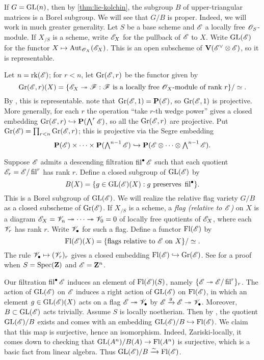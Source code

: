 \begin{example}
If $G=\operatorname{GL}(n)$, then by \autoref{thm:lie-kolchin}, the subgroup $B$ of 
upper-triangular matrices is a Borel subgroup. We will see that 
$G/B$ is proper. Indeed, we will work in much greater generality. Let $S$ be a 
base scheme and $\mathscr{E}$ a locally free $\mathscr{O}_S$-module. If $X_{/S}$ is a scheme, 
write $\mathscr{E}_X$ for the pullback of $\mathscr{E}$ to $X$. Write $\operatorname{GL}(\mathscr{E})$ for the 
functor $X\mapsto \operatorname{Aut}_{\mathscr{O}_X}(\mathscr{E}_X)$. This is an open subscheme of 
$\mathbf{V}(\mathscr{E}^\vee\otimes \mathscr{E})$, so it is representable. 

Let $n=\operatorname{rk}(\mathscr{E})$; for $r<n$, let $\operatorname{Gr}(\mathscr{E},r)$ be the functor given 
by 
\[
  \operatorname{Gr}(\mathscr{E},r)(X) = \{\mathscr{E}_X\twoheadrightarrow \mathscr{F}:\text{$\mathscr{F}$ is a locally free $\mathscr{O}_X$-module of rank $r$}\} /\simeq .
\]
By \cite[ex.2]{nitsure-2005}, this is representable. note that 
$\operatorname{Gr}(\mathscr{E},1) = \mathbf{P}(\mathscr{E})$, so $\operatorname{Gr}(\mathscr{E},1)$ is projective. 
More generally, for each $r$ the operation ``take $r$-th wedge power'' gives 
a closed embedding $\operatorname{Gr}(\mathscr{E},r) \hookrightarrow \mathbf{P}(\bigwedge^r\mathscr{E})$, so all 
the $\operatorname{Gr}(\mathscr{E},r)$ are projective. Put 
$\operatorname{Gr}(\mathscr{E})=\prod_{r<n} \operatorname{Gr}(\mathscr{E},r)$; this is 
projective via the Segre embedding \cite[II 4.3.3]{ega2}
\[
  \mathbf{P}(\mathscr{E})\times \cdots \times \mathbf{P}(\textstyle\bigwedge^{n-1}\mathscr{E})\hookrightarrow \mathbf{P}(\mathscr{E}\otimes \cdots \otimes \textstyle\bigwedge^{n-1} \mathscr{E}) .
\]

Suppose $\mathscr{E}$ admits a descending filtration $\operatorname{fil}^\bullet\mathscr{E}$ such that 
each quotient $\mathscr{E}_r=\mathscr{E}/\operatorname{fil}^r$ has rank $r$. Define a closed subgroup 
of $\operatorname{GL}(\mathscr{E})$ by 
\[
  B(X) = \{g\in \operatorname{GL}(\mathscr{E})(X):g\text{ preserves }\operatorname{fil}^\bullet\} .
\]
This is a Borel subgroup of $\operatorname{GL}(\mathscr{E})$. We will realize the relative 
flag variety $G/B$ as a closed subscheme of $\operatorname{Gr}(\mathscr{E})$. 
If $X_{/S}$ is a scheme, a \emph{flag (relative to $\mathscr{E}$)} on $X$ is a diagram 
$\mathscr{E}_X=\mathscr{V}_n\twoheadrightarrow \cdots \twoheadrightarrow \mathscr{V}_0=0$ of locally free quotients of $\mathscr{E}_X$, 
where each $\mathscr{V}_r$ has rank $r$. Write $\mathscr{V}_\bullet$ for such a flag. Define a 
functor $\operatorname{Fl}(\mathscr{E})$ by 
\[
  \operatorname{Fl}(\mathscr{E})(X) = \{\text{flags relative to $\mathscr{E}$ on $X$}\} / \simeq .
\]
The rule $\mathscr{V}_\bullet\mapsto (\mathscr{V}_r)_r$ gives a closed embedding 
$\operatorname{Fl}(\mathscr{E})\hookrightarrow \operatorname{Gr}(\mathscr{E})$. See 
\cite[I \S 2 6.3]{demazure-gabriel-1980} for a proof when $S=\operatorname{Spec}(\mathbf{Z})$ 
and $\mathscr{E}=\mathbf{Z}^n$. 

Our filtration $\operatorname{fil}^\bullet\mathscr{E}$ induces an element of $\operatorname{Fl}(\mathscr{E})(S)$, 
namely $\{\mathscr{E}\twoheadrightarrow\mathscr{E}/\operatorname{fil}^r\}_r$. The action of $\operatorname{GL}(\mathscr{E})$ on $\mathscr{E}$ 
induces a right action of $\operatorname{GL}(\mathscr{E})$ on $\operatorname{Fl}(\mathscr{E})$, in which an 
element $g\in \operatorname{GL}(\mathscr{E})(X)$ acts on a flag $\mathscr{E}\twoheadrightarrow \mathscr{V}_\bullet$ by 
$\mathscr{E}\xrightarrow g \mathscr{E}\twoheadrightarrow \mathscr{V}_\bullet$. Moreover, $B\subset \operatorname{GL}(\mathscr{E})$ 
acts trivially. Assume $S$ is locally noetherian. Then by 
\cite[V 10.1.1]{sga3-i}, the quotient $\operatorname{GL}(\mathscr{E})/B$ exists and comes with 
an embedding $\operatorname{GL}(\mathscr{E})/B\hookrightarrow \operatorname{Fl}(\mathscr{E})$. We claim that this map is 
surjective, hence an isomorphism. Indeed, Zariski-locally, it comes down to 
checking that $\operatorname{GL}(A^n)/B(A)\to \operatorname{Fl}(A^n)$ is surjective, which is a basic 
fact from linear algebra. Thus $\operatorname{GL}(\mathscr{E})/B\xrightarrow\sim \operatorname{Fl}(\mathscr{E})$. 
\end{example}

